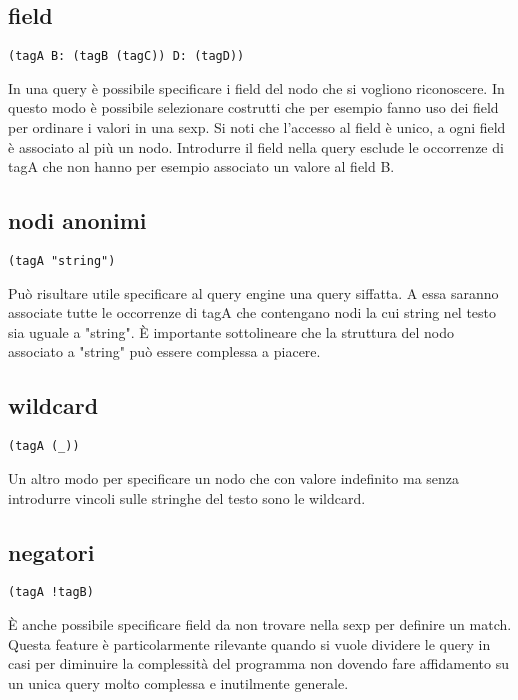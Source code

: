 \subsection{field}

\begin{lstlisting}
(tagA B: (tagB (tagC)) D: (tagD))
\end{lstlisting}

In una query \`e possibile specificare i field del nodo che si vogliono riconoscere.
In questo modo \`e possibile selezionare costrutti che per esempio fanno uso dei field per ordinare i valori in una sexp.
Si noti che l'accesso al field \`e unico, a ogni field \`e associato al pi\`u un nodo.
Introdurre il field nella query esclude le occorrenze di tagA che non hanno per esempio associato un valore al field B.

\subsection{nodi anonimi}

\begin{lstlisting}
(tagA "string")
\end{lstlisting}

Pu\`o risultare utile specificare al query engine una query siffatta.
A essa saranno associate tutte le occorrenze di tagA che contengano nodi la cui string nel testo sia uguale a "string".
\`E importante sottolineare che la struttura del nodo associato a "string" pu\`o essere complessa a piacere.

\subsection{wildcard}

\begin{lstlisting}
(tagA (_))
\end{lstlisting}

Un altro modo per specificare un nodo che con valore indefinito ma senza introdurre vincoli sulle stringhe del testo sono le wildcard.

\subsection{negatori}

\begin{lstlisting}
(tagA !tagB)
\end{lstlisting}

\`E anche possibile specificare field da non trovare nella sexp per definire un match.
Questa feature \`e particolarmente rilevante quando si vuole dividere le query in casi per diminuire la complessit\`a del programma non dovendo fare affidamento su un unica query molto complessa e inutilmente generale.

